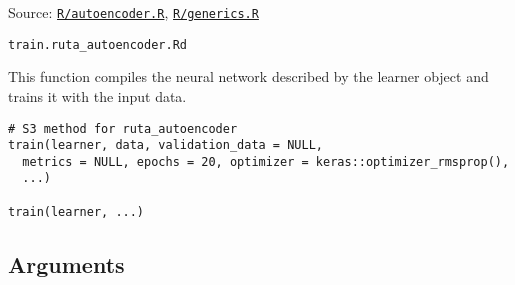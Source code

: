 Source:
\href{https://github.com/fdavidcl/ruta/blob/master/R/autoencoder.R}{\texttt{R/autoencoder.R}},
\href{https://github.com/fdavidcl/ruta/blob/master/R/generics.R}{\texttt{R/generics.R}}

\texttt{train.ruta\_autoencoder.Rd}

This function compiles the neural network described by the learner
object and trains it with the input data.

\begin{verbatim}
# S3 method for ruta_autoencoder
train(learner, data, validation_data = NULL,
  metrics = NULL, epochs = 20, optimizer = keras::optimizer_rmsprop(),
  ...)

train(learner, ...)
\end{verbatim}

\hypertarget{arguments}{\subsection{\texorpdfstring{\protect\hyperlink{arguments}{}Arguments}{Arguments}}\label{arguments}}

